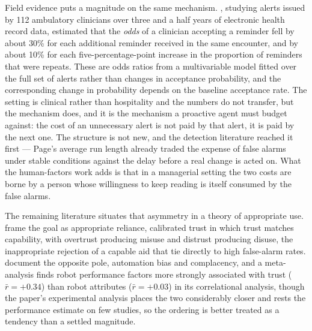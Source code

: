 Field evidence puts a magnitude on the same mechanism.
\citet{ancker_effects_2017}, studying alerts issued by 112 ambulatory clinicians
over three and a half years of electronic health record data, estimated that the
\emph{odds} of a clinician accepting a reminder fell by about 30\% for each
additional reminder received in the same encounter, and by about 10\% for each
five-percentage-point increase in the proportion of reminders that were
repeats. These are odds ratios from a multivariable model fitted over the full
set of alerts rather than changes in acceptance probability, and the
corresponding change in probability depends on the baseline acceptance rate.
The setting is clinical rather than hospitality and the numbers do not transfer,
but the mechanism does, and it is the mechanism a proactive agent must budget
against: the cost of an unnecessary alert is not paid by that alert, it is paid
by the next one. The structure is not new, and the detection literature reached
it first --- Page's average run length \citep{page_continuous_1954} already
traded the expense of false alarms under stable conditions against the delay
before a real change is acted on. What the human-factors work adds is that in a
managerial setting the two costs are borne by a person whose willingness to
keep reading is itself consumed by the false alarms.

The remaining literature situates that asymmetry in a theory of appropriate
use. \citet{lee_trust_2004} frame the goal as appropriate reliance, calibrated
trust in which trust matches capability, with overtrust producing misuse and
distrust producing disuse, the inappropriate rejection of a capable aid that
\citet{parasuraman_humans_1997} tie directly to high false-alarm rates.
\citet{parasuraman_complacency_2010} document the opposite pole, automation
bias and complacency, and a meta-analysis \citep{hancock_meta-analysis_2011}
finds robot performance factors more strongly associated with trust
($\bar{r} = +0.34$) than robot attributes ($\bar{r} = +0.03$) in its
correlational analysis, though the paper's experimental analysis places the two
considerably closer and rests the performance estimate on few studies, so the
ordering is better treated as a tendency than a settled magnitude.

